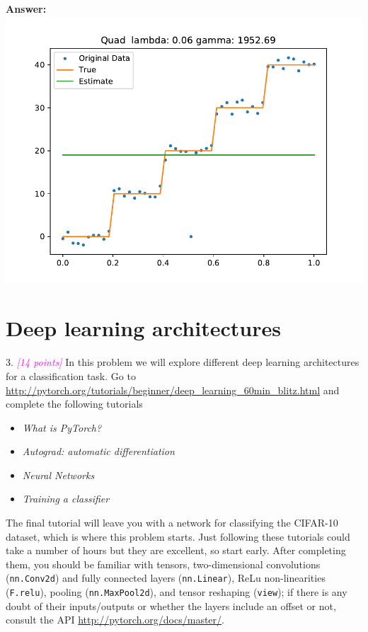 \documentclass{article}
\newcommand{\1}{\mathbf{1}}
\newcommand{\grade}[1]{\small\textcolor{magenta}{\emph{[#1 points]}} \normalsize}
\begin{document}
\begin{enumerate}
\textbf{Answer:}\\
\includegraphics{2_quad.pdf}


\end{enumerate}


\section*{Deep learning architectures}

3. \grade{14} In this problem we will explore different deep learning architectures for a classification task. 
Go to \url{http://pytorch.org/tutorials/beginner/deep_learning_60min_blitz.html} and complete the following tutorials\\[-18pt]
\begin{itemize}
  \item \emph{What is PyTorch?}\\[-18pt]
  \item \emph{Autograd: automatic differentiation}\\[-18pt]
  \item \emph{Neural Networks}\\[-18pt]
  \item \emph{Training a classifier}\\[-18pt]
\end{itemize}
The final tutorial will leave you with a network for classifying the CIFAR-10 dataset, which is where this problem starts. 
Just following these tutorials could take a number of hours but they are excellent, so start early. 
After completing them, you should be familiar with tensors, two-dimensional convolutions (\texttt{nn.Conv2d}) and fully connected layers (\texttt{nn.Linear}), ReLu non-linearities (\texttt{F.relu}), pooling (\texttt{nn.MaxPool2d}), and tensor reshaping (\texttt{view}); if there is any doubt of their inputs/outputs or whether the layers include an offset or not, consult the API \url{http://pytorch.org/docs/master/}. \\
\end{document}
